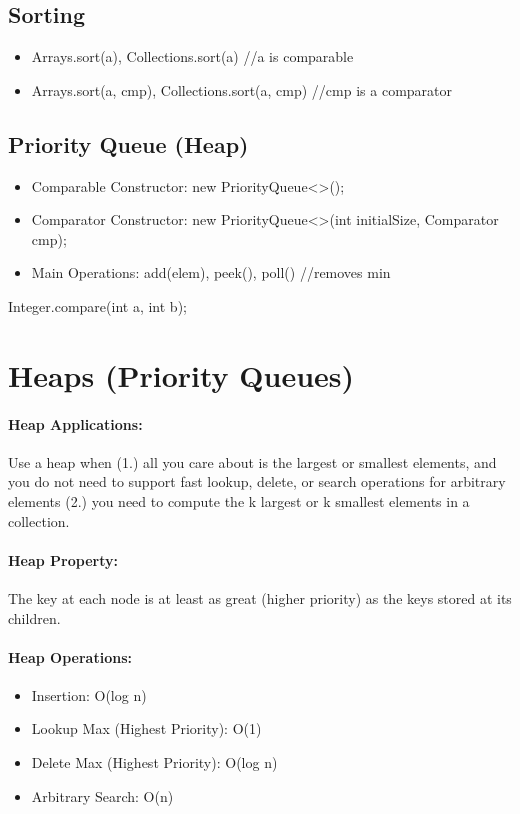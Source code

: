 \documentclass[12pt]{article}
\begin{document}
\subsection{Sorting}
\begin{itemize}
	\item Arrays.sort(a), Collections.sort(a) //a is comparable
	\item Arrays.sort(a, cmp), Collections.sort(a, cmp) //cmp is a comparator
\end{itemize}

\subsection{Priority Queue (Heap)}
\begin{itemize}
	\item Comparable Constructor: new PriorityQueue<>();
	\item Comparator Constructor: new PriorityQueue<>(int initialSize, Comparator cmp);
	\item Main Operations: add(elem), peek(), poll() //removes min
\end{itemize}

Integer.compare(int a, int b);

\section{Heaps (Priority Queues)}

\paragraph{Heap Applications:} Use a heap when (1.) all you care about is the largest or smallest elements, and you do not need to support fast lookup, delete, or search operations for arbitrary elements
(2.) you need to compute the k largest or k smallest elements in a collection.

\paragraph{Heap Property:} The key at each node is at least as great (higher priority) as the keys stored at its children.

\paragraph{Heap Operations:}
\begin{itemize}
	\item Insertion: O(log n)
	\item Lookup Max (Highest Priority): O(1)
	\item Delete Max (Highest Priority): O(log n)
	\item Arbitrary Search: O(n)
\end{itemize}
\end{document}

